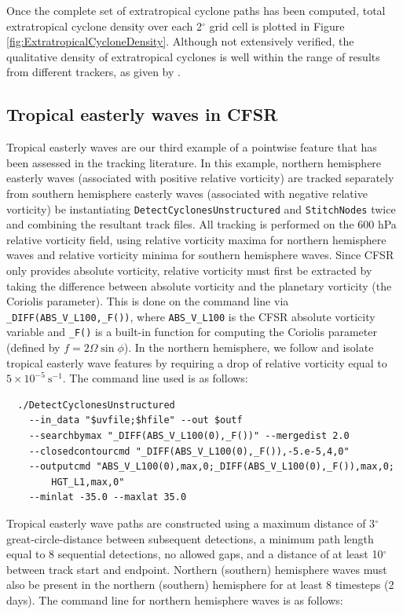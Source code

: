 \documentclass[gmdd, hvmath]{copernicus}
\begin{document}
Once the complete set of extratropical cyclone paths has been computed, total extratropical cyclone density over each 2$^\circ$ grid cell is plotted in Figure \ref{fig:ExtratropicalCycloneDensity}.  Although not extensively verified, the qualitative density of extratropical cyclones is well within the range of results from different trackers, as given by \cite{neu2013imilast}.

\subsection{Tropical easterly waves in CFSR} \label{sec:TropicalEasterlyWavesExample}

Tropical easterly waves are our third example of a pointwise feature that has been assessed in the tracking literature.  In this example, northern hemisphere easterly waves (associated with positive relative vorticity) are tracked separately from southern hemisphere easterly waves (associated with negative relative vorticity) be instantiating \texttt{DetectCyclonesUnstructured} and \texttt{StitchNodes} twice and combining the resultant track files.  All tracking is performed on the 600 hPa relative vorticity field, using relative vorticity maxima for northern hemisphere waves and relative vorticity minima for southern hemisphere waves.  Since CFSR only provides absolute vorticity, relative vorticity must first be extracted by taking the difference between absolute vorticity and the planetary vorticity (the Coriolis parameter).  This is done on the command line via \texttt{\_DIFF(ABS\_V\_L100,\_F())}, where \texttt{ABS\_V\_L100} is the CFSR absolute vorticity variable and \texttt{\_F()} is a built-in function for computing the Coriolis parameter (defined by $f = 2 \Omega \sin \phi$).  In the northern hemisphere, we follow \cite{thorncroft2001african} and isolate tropical easterly wave features by requiring a drop of relative vorticity equal to $5 \times 10^{-5}\ \mbox{s}^{-1}$.  The command line used is as follows:

{\small \begin{verbatim}
  ./DetectCyclonesUnstructured
    --in_data "$uvfile;$hfile" --out $outf
    --searchbymax "_DIFF(ABS_V_L100(0),_F())" --mergedist 2.0
    --closedcontourcmd "_DIFF(ABS_V_L100(0),_F()),-5.e-5,4,0"
    --outputcmd "ABS_V_L100(0),max,0;_DIFF(ABS_V_L100(0),_F()),max,0;
        HGT_L1,max,0"
    --minlat -35.0 --maxlat 35.0 
\end{verbatim}}

Tropical easterly wave paths are constructed using a maximum distance of 3$^\circ$ great-circle-distance between subsequent detections, a minimum path length equal to 8 sequential detections, no allowed gaps, and a distance of at least 10$^\circ$ between track start and endpoint.  Northern (southern) hemisphere waves must also be present in the northern (southern) hemisphere for at least 8 timesteps (2 days).  The command line for northern hemisphere waves is as follows:
\end{document}

